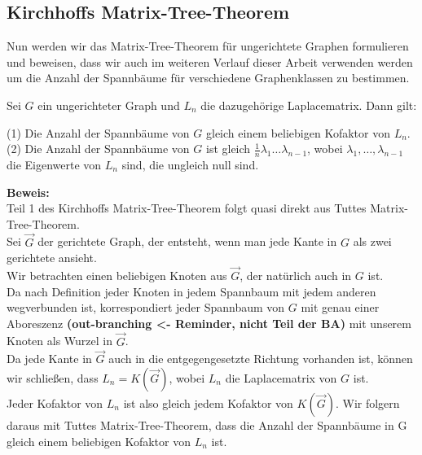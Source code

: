 \subsection{Kirchhoffs Matrix-Tree-Theorem}
Nun werden wir das Matrix-Tree-Theorem für ungerichtete Graphen formulieren und beweisen, dass wir auch im weiteren Verlauf dieser Arbeit verwenden werden um die Anzahl der Spannbäume für verschiedene Graphenklassen zu bestimmen.
\begin{Tms}
Sei $G$ ein ungerichteter Graph und $L_n$  die dazugehörige Laplacematrix. 
Dann gilt:
\par
\begingroup
\leftskip=20pt%
\rightskip=20pt
\noindent %
(1) Die Anzahl der Spannbäume von $G$ gleich einem beliebigen Kofaktor von $L_n$.\\
(2) Die Anzahl der Spannbäume von $G$ ist gleich $\frac{1}{n}\lambda_1\ldots\lambda_{n-1}$, wobei $\lambda_1,\ldots,\lambda_{n-1}$ die Eigenwerte von $L_n$ sind, die ungleich null sind.
\par
\endgroup
\end{Tms}
\textbf{Beweis:}\\
Teil 1 des Kirchhoffs Matrix-Tree-Theorem folgt quasi direkt aus Tuttes Matrix-Tree-Theorem. \\
Sei $\vec{G}$ der gerichtete Graph, der entsteht, wenn man jede Kante in $G$ als zwei gerichtete ansieht.\\
Wir betrachten einen beliebigen Knoten aus $\vec{G}$, der natürlich auch in $G$ ist. \\
Da nach Definition jeder Knoten in jedem Spannbaum mit jedem anderen wegverbunden ist, korrespondiert jeder Spannbaum von $G$ mit genau einer Aboreszenz \textbf{(out-branching <- Reminder, nicht Teil der BA)} mit unserem Knoten als Wurzel in $\vec{G}$. \\
Da jede Kante in $\vec{G}$ auch in die entgegengesetzte Richtung vorhanden ist, können wir schließen, dass $L_n=K(\vec{G})$, wobei $L_n$ die Laplacematrix von $G$ ist. \\
Jeder Kofaktor von $L_n$ ist also gleich jedem Kofaktor von $K(\vec{G})$.
Wir folgern daraus mit Tuttes Matrix-Tree-Theorem, dass die Anzahl der Spannbäume in G gleich einem beliebigen Kofaktor von $L_n$ ist.\\ \\
